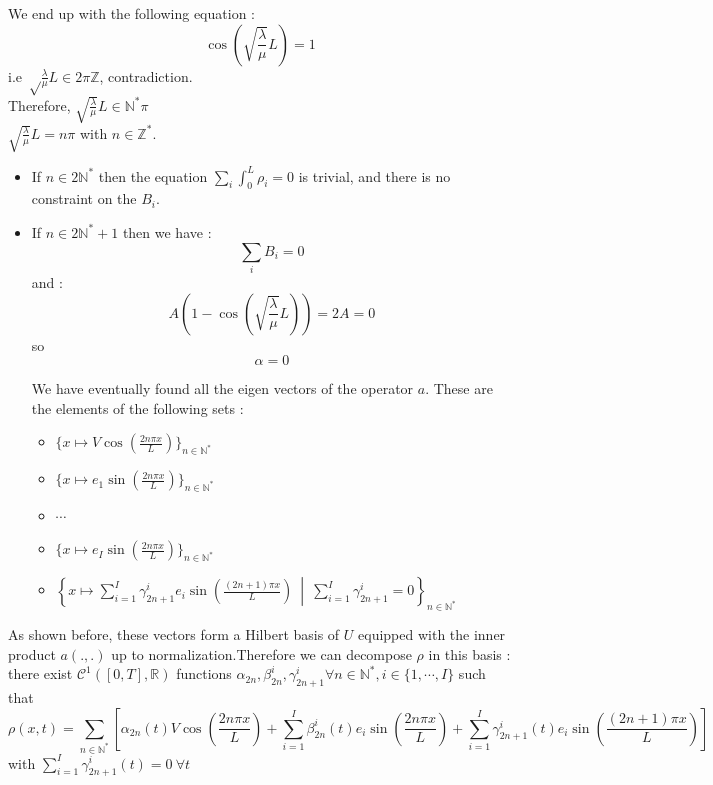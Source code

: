 \documentclass{article}
\begin{document}
We end up with the following equation : \[\cos\left(\sqrt{\frac{\lambda}{\mu}}L\right) = 1\]
i.e $\sqrt\frac{\lambda}{\mu}L \in 2\pi\mathbb{Z}$, contradiction.\\

Therefore, $\sqrt{\frac{\lambda}{\mu}}L \in \mathbb{N^*}\pi$\\

$\sqrt{\frac{\lambda}{\mu}}L = n\pi$ with $n \in \mathbb{Z^*}$. 

\begin{itemize}
    \item If $n \in 2\mathbb{N^*} $ then the equation $\sum_i\int_0^L\rho_i = 0$ is trivial, and there is no constraint on the $B_i$.

\item If $n \in 2\mathbb{N^*}  + 1$ then we have :
\[\sum_iB_i = 0\]
and :
\[A\left(1-\cos\left(\sqrt{\frac{\lambda}{\mu}}L\right)\right) = 2A = 0\] so \[\alpha = 0\]

We have eventually found all the eigen vectors of the operator $a$. These are the elements of the following sets :
\begin{itemize}
    \item \( \{x \mapsto V\cos(\frac{2n\pi x}{L})\}_{n \in \mathbb{N^*}} \)
    \item \( \{x \mapsto e_1\sin(\frac{2n\pi x}{L})\}_{n \in \mathbb{N^*}} \)
    \item \( \cdots \)
    \item \( \{ x \mapsto e_I\sin(\frac{2n\pi x}{L})\}_{n \in \mathbb{N^*}} \)
    \item \( 
        \left\{ x \mapsto \sum_{i=1}^I\gamma_{2n + 1}^{i} e_i\sin(\frac{(2n + 1)\pi x}{L}) \ \middle| \ \sum_{i=1}^{I} \gamma_{2n + 1}^{i} = 0 \right\}_{n \in \mathbb{N^*}}
    \)
\end{itemize}

\end{itemize} 

As shown before, these vectors form a Hilbert basis of $U$ equipped with the inner product $a(., .)$ up to normalization.Therefore we can decompose $\rho$ in this basis : there exist $\mathcal{C}^1([0, T], \mathbb{R}) $ functions  $\alpha_{2n}, \beta_{2n}^{i}, \gamma_{2n+1}^{i} \forall n \in \mathbb{N^*}, i \in \{1, \cdots, I\}$ such that 
\[\rho(x, t) = \sum_{n \in \mathbb{N^*}}\left[ \alpha_{2n}(t)V\cos\left(\frac{2n\pi x}{L}\right) + \sum_{i=1}^{I}\beta_{2n}^{i}(t)e_i \sin\left(\frac{2n\pi x}{L}\right) + \sum_{i=1}^{I}\gamma_{2n+1}^{i}(t)e_i \sin\left(\frac{(2n + 1)\pi x}{L}\right)\right]\] with $\sum_{i=1}^{I}\gamma_{2n+1}^{i}(t) = 0\ \forall t$ \\ \\
\end{document}
